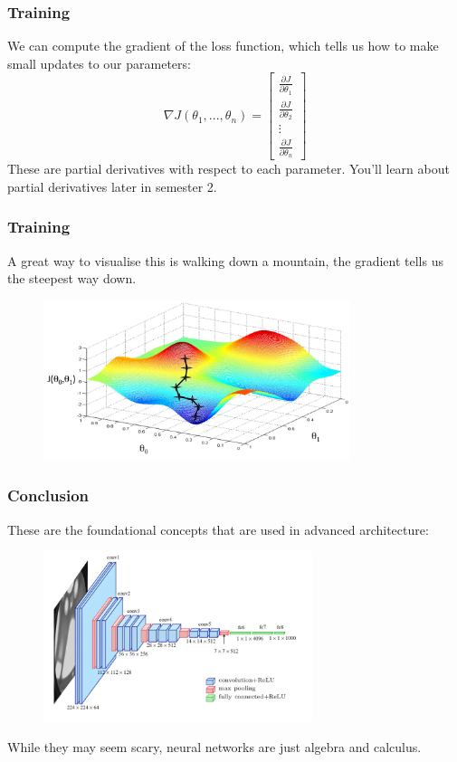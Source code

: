 \documentclass{beamer}
\begin{document}
\begin{frame}
    \frametitle{Training}
    We can compute the \alert{gradient} of the loss function, which tells us how to make small updates to our parameters:
    \[\nabla J(\theta_1,... , \theta_n) = \begin{bmatrix}
        \frac{\partial J}{\partial \theta_1} \\[6pt]
        \frac{\partial J}{\partial \theta_2} \\[6pt]
        \vdots \\[6pt]
        \frac{\partial J}{\partial \theta_n}
    \end{bmatrix}\]
    These are partial derivatives with respect to each parameter. You'll learn about partial derivatives later in semester 2. 
\end{frame}

\begin{frame}
    \frametitle{Training}
    A great way to visualise this is walking down a mountain, the gradient tells us the steepest way down. 
    \begin{figure}
        \centering
        \includegraphics[width=0.8\textwidth]{images/gradient-descent.png}
    \end{figure}
\end{frame}

\begin{frame}
    \frametitle{Conclusion}
    These are the foundational concepts that are used in advanced architecture:
    \begin{figure}
        \centering
        \includegraphics[width=0.7\textwidth]{images/vgg-architecture.png}
    \end{figure}
    While they may seem scary, neural networks are just algebra and calculus.
\end{frame}
\end{document}

